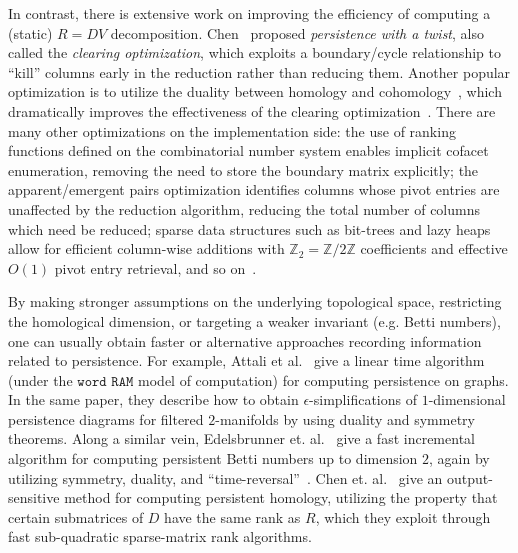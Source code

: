 \documentclass{article} %
\begin{document}
In contrast, there is extensive work  on improving the efficiency of computing a (static) $R = DV$ decomposition. Chen~\cite{chen2011persistent} proposed \emph{persistence with a twist}, also called the \emph{clearing optimization}, which exploits a boundary/cycle relationship to ``kill'' columns early in the reduction rather than reducing them. 
Another popular optimization is to utilize the duality between   homology and cohomology~\cite{de2011dualities}, which dramatically improves the effectiveness of the clearing optimization~\cite{bauer2021ripser}. 
There are many other optimizations on the implementation side: the use of ranking functions defined on the combinatorial number system enables implicit cofacet enumeration, removing the need to store the boundary matrix explicitly; the apparent/emergent pairs optimization identifies columns whose pivot entries are unaffected by the reduction algorithm, reducing the total number of columns which need be reduced; sparse data structures such as bit-trees and lazy heaps allow for efficient column-wise additions with $\mathbb{Z}_2 = \mathbb{Z}/2\mathbb{Z}$ coefficients and effective $O(1)$ pivot entry retrieval, and so on~\cite{bauer2021ripser, bauer2017phat}. 

By making stronger assumptions on the underlying topological space, restricting the homological dimension, or targeting  a weaker invariant (e.g. Betti numbers), one can usually obtain  faster or alternative approaches  recording information related to persistence.
For example, Attali et al.~\cite{attali2009persistence} give a linear time algorithm (under the $\texttt{word RAM}$ model of computation) for computing persistence on graphs.
In the same paper, they describe how to obtain $\epsilon$-simplifications of $1$-dimensional persistence diagrams for filtered $2$-manifolds by using duality and symmetry theorems. 
Along a similar vein, Edelsbrunner et. al.~\cite{edelsbrunner2000topological} give a fast incremental algorithm for computing persistent Betti numbers up to dimension $2$, again by utilizing symmetry, duality, and ``time-reversal''~\cite{delfinado1995incremental}. Chen et. al.~\cite{chen2013output} give an output-sensitive method for computing persistent homology,  utilizing the property that certain submatrices of  $D$ have the same rank as  $R$, which they exploit through fast sub-quadratic sparse-matrix rank algorithms.  
\end{document}
